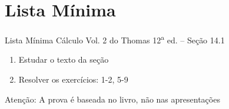 \documentclass[fleqn,utf8,aspectratio=169,12pt]{beamer}
\begin{document}




\section{Lista Mínima}

\begin{frame}{Lista Mínima}
  Cálculo Vol. 2 do Thomas 12\textsuperscript{a} ed. -- Seção 14.1
  \begin{enumerate}
    \item Estudar o texto da seção
    \item Resolver os exercícios: 1-2, 5-9
  \end{enumerate}

  \vfill
  Atenção: A prova é baseada no livro, não nas apresentações
\end{frame}

\end{document}
